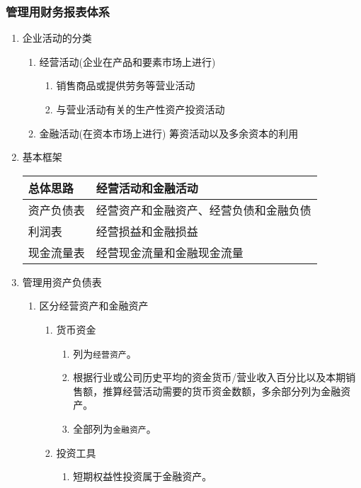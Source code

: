 \documentclass[11pt]{article}
\begin{document}
\subsubsection{管理用财务报表体系}
\label{sec:orgab6e53c}
\begin{enumerate}
\item 企业活动的分类
\label{sec:org2f903b6}
\begin{enumerate}
\item 经营活动(企业在产品和要素市场上进行)
\label{sec:org3ab1443}
\begin{enumerate}
\item 销售商品或提供劳务等营业活动
\item 与营业活动有关的生产性资产投资活动
\end{enumerate}
\item 金融活动(在资本市场上进行)
\label{sec:orgb46b88e}
筹资活动以及多余资本的利用
\end{enumerate}
\item 基本框架
\label{sec:org0f31ecb}
\begin{center}
\begin{tabular}{ll}
总体思路 & 经营活动和金融活动\\
\hline
资产负债表 & 经营资产和金融资产、经营负债和金融负债\\
利润表 & 经营损益和金融损益\\
现金流量表 & 经营现金流量和金融现金流量\\
\end{tabular}
\end{center}
\item 管理用资产负债表
\label{sec:orgeb39475}
\begin{enumerate}
\item 区分经营资产和金融资产
\label{sec:org3203f76}
\begin{enumerate}
\item 货币资金
\label{sec:org42ef7ce}
\begin{enumerate}
\item 列为\texttt{经营资产}。
\item 根据行业或公司历史平均的资金货币/营业收入百分比以及本期销售额，推算经营活动需要的货币资金数额，多余部分列为金融资产。
\item 全部列为\texttt{金融资产}。
\end{enumerate}
\item 投资工具
\label{sec:org0d0dec6}
\begin{enumerate}
\item 短期权益性投资属于金融资产。

\end{enumerate}
\end{enumerate}
\end{enumerate}
\end{enumerate}
\end{document}
